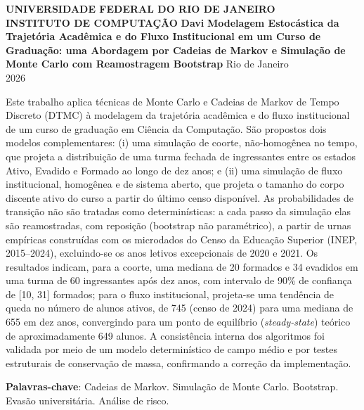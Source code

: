 \documentclass[12pt,times,article,chapter=TITLE]{abnt}
\begin{document}
\thispagestyle{empty}
\setcounter{page}{0}
\begin{center}
\vspace*{1cm}
{\bfseries UNIVERSIDADE FEDERAL DO RIO DE JANEIRO\\ INSTITUTO DE COMPUTAÇÃO}
\vfill\vfill
{\bfseries \Large Davi}
\vfill\vfill
{\bfseries \Large Modelagem Estocástica da Trajetória Acadêmica e do Fluxo Institucional em um Curso de Graduação: uma Abordagem por Cadeias de Markov e Simulação de Monte Carlo com Reamostragem Bootstrap}
\vfill\vfill\vfill
Rio de Janeiro\\
2026
\vspace*{1cm}
\end{center}
\newpage

\folhaderosto

\begin{resumo}
Este trabalho aplica técnicas de Monte Carlo e Cadeias de Markov de Tempo Discreto (DTMC) à modelagem da trajetória acadêmica e do fluxo institucional de um curso de graduação em Ciência da Computação. São propostos dois modelos complementares: (i) uma simulação de coorte, não-homogênea no tempo, que projeta a distribuição de uma turma fechada de ingressantes entre os estados Ativo, Evadido e Formado ao longo de dez anos; e (ii) uma simulação de fluxo institucional, homogênea e de sistema aberto, que projeta o tamanho do corpo discente ativo do curso a partir do último censo disponível. As probabilidades de transição não são tratadas como determinísticas: a cada passo da simulação elas são reamostradas, com reposição (bootstrap não paramétrico), a partir de urnas empíricas construídas com os microdados do Censo da Educação Superior (INEP, 2015--2024), excluindo-se os anos letivos excepcionais de 2020 e 2021. Os resultados indicam, para a coorte, uma mediana de 20 formados e 34 evadidos em uma turma de 60 ingressantes após dez anos, com intervalo de 90\% de confiança de [10, 31] formados; para o fluxo institucional, projeta-se uma tendência de queda no número de alunos ativos, de 745 (censo de 2024) para uma mediana de 655 em dez anos, convergindo para um ponto de equilíbrio (\textit{steady-state}) teórico de aproximadamente 649 alunos. A consistência interna dos algoritmos foi validada por meio de um modelo determinístico de campo médio e por testes estruturais de conservação de massa, confirmando a correção da implementação.

\vspace{1cm}
\noindent \textbf{Palavras-chave}: Cadeias de Markov. Simulação de Monte Carlo. Bootstrap. Evasão universitária. Análise de risco.
\end{resumo}
\end{document}
